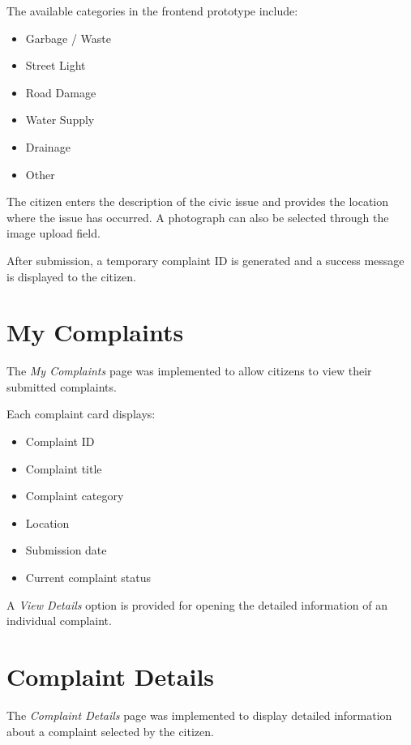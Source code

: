 \documentclass[12pt,a4paper]{article}
\begin{document}
The available categories in the frontend prototype include:

\begin{itemize}
    \item Garbage / Waste
    \item Street Light
    \item Road Damage
    \item Water Supply
    \item Drainage
    \item Other
\end{itemize}

The citizen enters the description of the civic issue and provides the
location where the issue has occurred. A photograph can also be selected
through the image upload field.

After submission, a temporary complaint ID is generated and a success
message is displayed to the citizen.

\section{My Complaints}

The \textit{My Complaints} page was implemented to allow citizens to view
their submitted complaints.

Each complaint card displays:

\begin{itemize}
    \item Complaint ID
    \item Complaint title
    \item Complaint category
    \item Location
    \item Submission date
    \item Current complaint status
\end{itemize}

A \textit{View Details} option is provided for opening the detailed
information of an individual complaint.

\section{Complaint Details}

The \textit{Complaint Details} page was implemented to display detailed
information about a complaint selected by the citizen.
\end{document}
